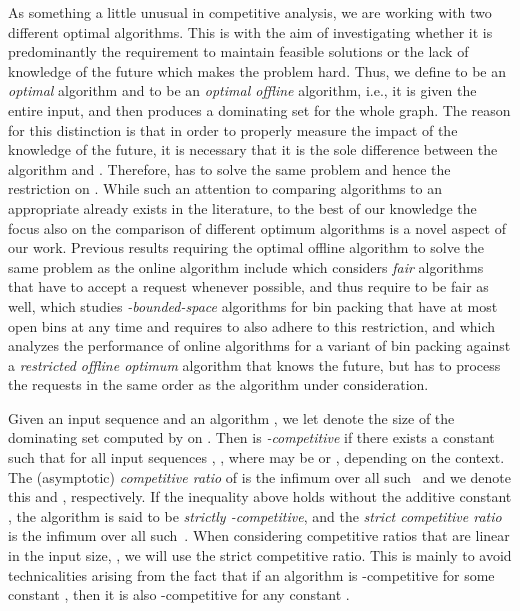 As something a little unusual in competitive analysis, we are working
with two different optimal algorithms. This is with the aim of
investigating whether it is predominantly the requirement to maintain
feasible solutions or the lack of knowledge of the future which makes
the problem hard.  Thus, we define \onopt to be an \emph{optimal \incr}
algorithm and \offopt to be an \emph{optimal offline}
algorithm, i.e., it is given the entire input, and then produces a
dominating set for the whole graph. The reason for this distinction is
that in order to properly measure the impact of the knowledge of the
future, it is necessary that it is the sole difference between the
algorithm and \opt. Therefore, \opt has to solve the same problem and
hence the restriction on \onopt.  While such an attention to comparing
algorithms to an appropriate \opt already exists in the literature, to
the best of our knowledge the focus also on the comparison of
different optimum algorithms is a novel aspect of our work. Previous
results requiring the optimal offline algorithm to solve the same
problem as the online algorithm include \cite{BL99} which
considers \emph{fair} algorithms that have to accept a request
whenever possible, and thus require \opt to be fair as well,
\cite{ChSW11} which studies \emph{-bounded-space} algorithms for
bin packing that have at most  open bins at any time and requires
\opt to also adhere to this restriction, and \cite{BSV15} which
analyzes the performance of online algorithms for a variant of bin
packing against a \emph{restricted offline optimum} algorithm that
knows the future, but has to process the requests in the same order as
the algorithm under consideration.


Given an input sequence  and an algorithm \ALG,
we let  denote the size of the
dominating set computed by \ALG on .
Then \ALG is
\emph{-competitive} if there exists a constant  such that
for all input sequences , ,
where \opt may be \onopt or \offopt, depending on the context.
The (asymptotic) \emph{competitive ratio} of \ALG is the infimum
over all such~ and we denote this 
and , respectively.
If the inequality above holds without the additive constant , the
algorithm is said to be {\em strictly -competitive}, and the 
 {\em strict competitive ratio} is the infimum over all such~.
When considering competitive ratios that are linear in the input size,
, we will use the strict competitive ratio.
This is mainly to avoid technicalities arising from the fact that if
an algorithm is -competitive for some constant , then it is
also -competitive for any constant .



